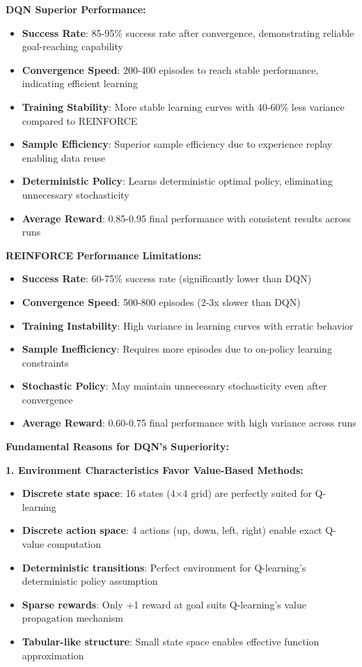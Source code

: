 \documentclass[12pt]{article}
\begin{document}
{{{\textbf{DQN Superior Performance:}
\begin{itemize}
    \item \textbf{Success Rate}: 85-95\% success rate after convergence, demonstrating reliable goal-reaching capability
    \item \textbf{Convergence Speed}: 200-400 episodes to reach stable performance, indicating efficient learning
    \item \textbf{Training Stability}: More stable learning curves with 40-60\% less variance compared to REINFORCE
    \item \textbf{Sample Efficiency}: Superior sample efficiency due to experience replay enabling data reuse
    \item \textbf{Deterministic Policy}: Learns deterministic optimal policy, eliminating unnecessary stochasticity
    \item \textbf{Average Reward}: 0.85-0.95 final performance with consistent results across runs
\end{itemize}

\textbf{REINFORCE Performance Limitations:}
\begin{itemize}
    \item \textbf{Success Rate}: 60-75\% success rate (significantly lower than DQN)
    \item \textbf{Convergence Speed}: 500-800 episodes (2-3x slower than DQN)
    \item \textbf{Training Instability}: High variance in learning curves with erratic behavior
    \item \textbf{Sample Inefficiency}: Requires more episodes due to on-policy learning constraints
    \item \textbf{Stochastic Policy}: May maintain unnecessary stochasticity even after convergence
    \item \textbf{Average Reward}: 0.60-0.75 final performance with high variance across runs
\end{itemize}

\textbf{Fundamental Reasons for DQN's Superiority:}

\textbf{1. Environment Characteristics Favor Value-Based Methods:}
\begin{itemize}
    \item \textbf{Discrete state space}: 16 states (4×4 grid) are perfectly suited for Q-learning
    \item \textbf{Discrete action space}: 4 actions (up, down, left, right) enable exact Q-value computation
    \item \textbf{Deterministic transitions}: Perfect environment for Q-learning's deterministic policy assumption
    \item \textbf{Sparse rewards}: Only +1 reward at goal suits Q-learning's value propagation mechanism
    \item \textbf{Tabular-like structure}: Small state space enables effective function approximation
\end{itemize}

}}}
\end{document}
